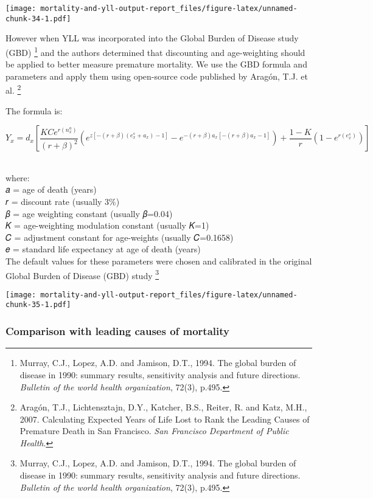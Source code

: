 \documentclass[
]{article}
\begin{document}
\texttt{[image: mortality-and-yll-output-report\_files/figure-latex/unnamed-chunk-34-1.pdf]}

However when YLL was incorporated into the Global Burden of Disease
study (GBD) \footnote{Murray, C.J., Lopez, A.D. and Jamison, D.T., 1994.
  The global burden of disease in 1990: summary results, sensitivity
  analysis and future directions. \emph{Bulletin of the world health
  organization}, 72(3), p.495.} and the authors determined that
discounting and age-weighting should be applied to better measure
premature mortality. We use the GBD formula and parameters and apply
them using open-source code published by Aragón, T.J. et al. \footnote{Aragón,
  T.J., Lichtensztajn, D.Y., Katcher, B.S., Reiter, R. and Katz, M.H.,
  2007. Calculating Expected Years of Life Lost to Rank the Leading
  Causes of Premature Death in San Francisco. \emph{San Francisco
  Department of Public Health}.}

The formula is:

\[Y_x = d_x \left[ \frac{KCe^{r(n^a_x)}}{(r+\beta)^2} \left( e^{z[-(r+\beta)(e^s_x + a_x) - 1]} - e^{-(r+\beta)a_x[-(r+\beta)a_x - 1]} \right) + \frac{1-K}{r} (1 - e^{r(e^s_x)}) \right]\]

~\\
where:\\
𝑎 = age of death (years)\\
𝑟 = discount rate (usually 3\%)\\
𝛽 = age weighting constant (usually 𝛽=0.04)\\
𝐾 = age-weighting modulation constant (usually 𝐾=1)\\
𝐶 = adjustment constant for age-weights (usually 𝐶=0.1658)\\
𝑒 = standard life expectancy at age of death (years)\\

The default values for these parameters were chosen and calibrated in
the original Global Burden of Disease (GBD) study \footnote{Murray,
  C.J., Lopez, A.D. and Jamison, D.T., 1994. The global burden of
  disease in 1990: summary results, sensitivity analysis and future
  directions. \emph{Bulletin of the world health organization}, 72(3),
  p.495.}

\texttt{[image: mortality-and-yll-output-report\_files/figure-latex/unnamed-chunk-35-1.pdf]}

\hypertarget{comparison-with-leading-causes-of-mortality}{%
\subsubsection{Comparison with leading causes of
mortality}\label{comparison-with-leading-causes-of-mortality}}
\end{document}
